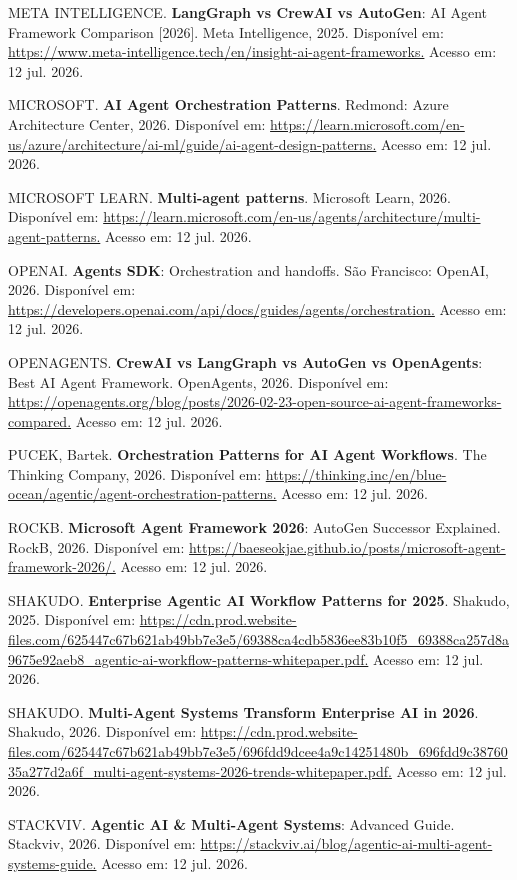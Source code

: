\documentclass[12pt,a4paper]{article}
\begin{document}
META INTELLIGENCE. \textbf{LangGraph vs CrewAI vs AutoGen}: AI Agent Framework Comparison [2026]. Meta Intelligence, 2025. Disponível em: \url{https://www.meta-intelligence.tech/en/insight-ai-agent-frameworks.} Acesso em: 12 jul. 2026.

MICROSOFT. \textbf{AI Agent Orchestration Patterns}. Redmond: Azure Architecture Center, 2026. Disponível em: \url{https://learn.microsoft.com/en-us/azure/architecture/ai-ml/guide/ai-agent-design-patterns.} Acesso em: 12 jul. 2026.

MICROSOFT LEARN. \textbf{Multi-agent patterns}. Microsoft Learn, 2026. Disponível em: \url{https://learn.microsoft.com/en-us/agents/architecture/multi-agent-patterns.} Acesso em: 12 jul. 2026.

OPENAI. \textbf{Agents SDK}: Orchestration and handoffs. São Francisco: OpenAI, 2026. Disponível em: \url{https://developers.openai.com/api/docs/guides/agents/orchestration.} Acesso em: 12 jul. 2026.

OPENAGENTS. \textbf{CrewAI vs LangGraph vs AutoGen vs OpenAgents}: Best AI Agent Framework. OpenAgents, 2026. Disponível em: \url{https://openagents.org/blog/posts/2026-02-23-open-source-ai-agent-frameworks-compared.} Acesso em: 12 jul. 2026.

PUCEK, Bartek. \textbf{Orchestration Patterns for AI Agent Workflows}. The Thinking Company, 2026. Disponível em: \url{https://thinking.inc/en/blue-ocean/agentic/agent-orchestration-patterns.} Acesso em: 12 jul. 2026.

ROCKB. \textbf{Microsoft Agent Framework 2026}: AutoGen Successor Explained. RockB, 2026. Disponível em: \url{https://baeseokjae.github.io/posts/microsoft-agent-framework-2026/.} Acesso em: 12 jul. 2026.

SHAKUDO. \textbf{Enterprise Agentic AI Workflow Patterns for 2025}. Shakudo, 2025. Disponível em: \url{https://cdn.prod.website-files.com/625447c67b621ab49bb7e3e5/69388ca4cdb5836ee83b10f5\_69388ca257d8a9675e92aeb8\_agentic-ai-workflow-patterns-whitepaper.pdf.} Acesso em: 12 jul. 2026.

SHAKUDO. \textbf{Multi-Agent Systems Transform Enterprise AI in 2026}. Shakudo, 2026. Disponível em: \url{https://cdn.prod.website-files.com/625447c67b621ab49bb7e3e5/696fdd9dcee4a9c14251480b\_696fdd9c3876035a277d2a6f\_multi-agent-systems-2026-trends-whitepaper.pdf.} Acesso em: 12 jul. 2026.

STACKVIV. \textbf{Agentic AI \& Multi-Agent Systems}: Advanced Guide. Stackviv, 2026. Disponível em: \url{https://stackviv.ai/blog/agentic-ai-multi-agent-systems-guide.} Acesso em: 12 jul. 2026.
\end{document}
